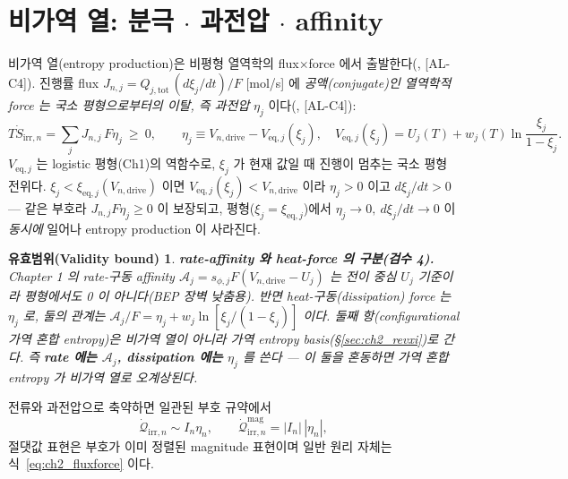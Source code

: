 \documentclass[11pt,a4paper]{article}
\newtheorem*{boundbox}{유효범위(Validity bound)}
\newcommand{\eq}{\mathrm{eq}}
\newcommand{\drive}{\mathrm{drive}}
\newcommand{\tot}{\mathrm{tot}}
\newcommand{\irr}{\mathrm{irr}}
\newcommand{\AL}[1]{\textsf{[AL-#1]}}
\begin{document}
\section{비가역 열: 분극 $\cdot$ 과전압 $\cdot$ affinity}\label{sec:ch2_irr}
비가역 열(entropy production)은 비평형 열역학의 flux$\times$force 에서 출발한다(\cite{degrootmazur1962,onsager1931}, \AL{C4}).
진행률 flux $J_{n,j}=Q_{j,\tot}\,(d\xi_j/dt)/F$ [mol/s] 에 \emph{공액(conjugate)인 열역학적 force 는 국소
평형으로부터의 이탈, 즉 과전압} $\eta_j$ 이다(\cite{newman2004,bardfaulkner}, \AL{C4}):
\begin{equation}
T\dot S_{\irr,n}=\sum_j J_{n,j}\,F\eta_j\ \ge\ 0,\qquad
\eta_j\equiv V_{n,\drive}-V_{\eq,j}(\xi_j),\quad
V_{\eq,j}(\xi_j)=U_j(T)+w_j(T)\ln\frac{\xi_j}{1-\xi_j}.
\label{eq:ch2_fluxforce}
\end{equation}
$V_{\eq,j}$ 는 logistic 평형(Ch1)의 역함수로, $\xi_j$ 가 현재 값일 때 진행이 멈추는 국소 평형 전위다.
$\xi_j<\xi_{\eq,j}(V_{n,\drive})$ 이면 $V_{\eq,j}(\xi_j)<V_{n,\drive}$ 이라 $\eta_j>0$ 이고 $d\xi_j/dt>0$ —
같은 부호라 $J_{n,j}F\eta_j\ge0$ 이 보장되고, 평형($\xi_j=\xi_{\eq,j}$)에서 $\eta_j\to0,\ d\xi_j/dt\to0$ 이
\emph{동시에} 일어나 entropy production 이 사라진다.
\begin{boundbox}
\textbf{rate-affinity 와 heat-force 의 구분(검수 4).} Chapter 1 의 \emph{rate-구동} affinity
$\mathcal A_j=s_{\phi,j}F(V_{n,\drive}-U_j)$ 는 전이 \emph{중심} $U_j$ 기준이라 평형에서도 0 이 아니다(BEP
장벽 낮춤용). 반면 \emph{heat-구동}(dissipation) force 는 $\eta_j$ 로, 둘의 관계는
$\mathcal A_j/F=\eta_j+w_j\ln[\xi_j/(1-\xi_j)]$ 이다. 둘째 항(configurational 가역 혼합 entropy)은 비가역
열이 아니라 가역 entropy basis(\S\ref{sec:ch2_revxi})로 간다. 즉 \textbf{rate 에는 $\mathcal A_j$,
dissipation 에는 $\eta_j$} 를 쓴다 — 이 둘을 혼동하면 가역 혼합 entropy 가 비가역 열로 오계상된다.
\end{boundbox}
전류와 과전압으로 축약하면 일관된 부호 규약에서
\begin{equation}
\dot{\mathcal Q}_{\irr,n}\sim I_n\eta_n,\qquad
\dot{\mathcal Q}_{\irr,n}^{\mathrm{mag}}=|I_n|\,|\eta_n|,
\label{eq:ch2_Ieta}
\end{equation}
절댓값 표현은 부호가 이미 정렬된 magnitude 표현이며 일반 원리 자체는 식~\eqref{eq:ch2_fluxforce} 이다.
\end{document}
